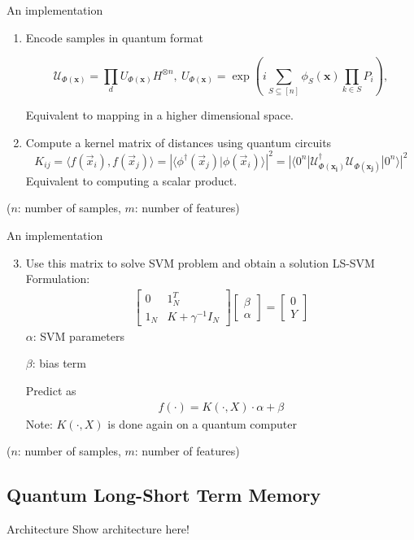 \begin{frame}{An implementation}
    \begin{enumerate}
        \item Encode samples in quantum format
        
        $$ \mathcal{U}_{\Phi(\mathbf{x})}=\prod_d U_{\Phi(\mathbf{x})}H^{\otimes n},\ U_{\Phi(\mathbf{x})}=\exp\left(i\sum_{S\subseteq[n]}\phi_S(\mathbf{x})\prod_{k\in S} P_i\right), $$
        
        Equivalent to mapping in a higher dimensional space.
        \vspace{0.5mm}
        \item Compute a kernel matrix of distances using quantum circuits
        $$K_{ij} = \langle f(\vec{x}_i), f(\vec{x}_j) \rangle = \left| \langle \phi^\dagger(\vec{x}_j)| \phi(\vec{x}_i) \rangle \right|^{2} = 
        |\langle 0^n |\mathcal{U}_{\Phi(\mathbf{x_i})}^{\dagger}\mathcal{U}_{\Phi(\mathbf{x_j})}| 0^n \rangle |^2
        $$
        Equivalent to computing a scalar product.
    \end{enumerate}
    
    ($n$: number of samples, $m$: number of features)
\end{frame}

\begin{frame}{An implementation}
    \begin{enumerate}
      \setcounter{enumi}{2}
        \item Use this matrix to solve SVM problem and obtain a solution
        LS-SVM Formulation:
            \begin{align*}
            \begin{bmatrix}
            0 & 1^T_N \\
            1_N & K+\gamma^{-1}I_N 
            \end{bmatrix}
            \begin{bmatrix}
            \beta \\
            \alpha
            \end{bmatrix} = 
            \begin{bmatrix}
            0 \\
            Y
            \end{bmatrix}
            \end{align*}
        $\alpha$: SVM parameters
        
        $\beta$: bias term
        
        Predict as
        \begin{align*}
        f(\cdot) = K( \cdot,X) \cdot \alpha + \beta
        \end{align*}
        Note: $K( \cdot,X)$ is done again on a quantum computer
    \end{enumerate}
    
    ($n$: number of samples, $m$: number of features)
\end{frame}

\subsection{Quantum Long-Short Term Memory}
\begin{frame}{Architecture}
    Show architecture here!
\end{frame}